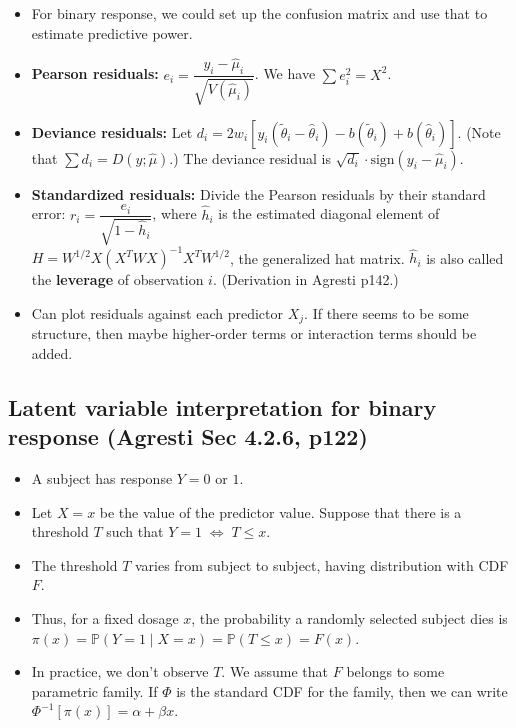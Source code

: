 \documentclass[twoside]{article}
\newcommand\bbP{\mathbb{P}}
\def\t{\theta}
\begin{document}
\begin{itemize}
\item For binary response, we could set up the confusion matrix and use that to estimate predictive power.

\item \textbf{Pearson residuals:} $e_i = \dfrac{y_i - \hat{\mu}_i}{\sqrt{V(\hat{\mu}_i)}}$. We have $\sum e_i^2 = X^2$.

\item \textbf{Deviance residuals:} Let $d_i = 2w_i[y_i (\tilde{\t}_i - \hat{\t}_i) - b(\tilde{\t}_i) + b(\hat{\t}_i)]$. (Note that $\sum d_i = D(y; \hat{\mu})$.) The deviance residual is $\sqrt{d_i} \cdot \text{sign}(y_i - \hat{\mu}_i)$.

\item \textbf{Standardized residuals:} Divide the Pearson residuals by their standard error: $r_i = \dfrac{e_i}{\sqrt{1 - \hat{h}_i}}$, where $\hat{h}_i$ is the estimated diagonal element of $H = W^{1/2}X(X^T W X)^{-1} X^T W^{1/2}$, the generalized hat matrix. $\hat{h}_i$ is also called the \textbf{leverage} of observation $i$. (Derivation in Agresti p142.)

\item Can plot residuals against each predictor $X_j$. If there seems to be some structure, then maybe higher-order terms or interaction terms should be added.

\end{itemize}

\subsection{Latent variable interpretation for binary response (Agresti Sec 4.2.6, p122)}
\begin{itemize}
\item A subject has response $Y = 0$ or $1$.
\item Let $X = x$ be the value of the predictor value. Suppose that there is a threshold $T$  such that $Y = 1 \; \Leftrightarrow \; T \leq x$.
\item The threshold $T$ varies from subject to subject, having distribution with CDF $F$.
\item Thus, for a fixed dosage $x$, the probability a randomly selected subject dies is $\pi(x) = \bbP(Y =1 \mid X = x) = \bbP(T \leq x) = F(x)$.
\item In practice, we don't observe $T$. We assume that $F$ belongs to some parametric family. If $\Phi$ is the standard CDF for the family, then we can write $\Phi^{-1}[\pi(x)] = \alpha + \beta x$.
\end{itemize}
\end{document}
